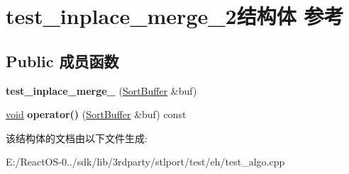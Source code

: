 \hypertarget{structtest__inplace__merge__2}{}\section{test\+\_\+inplace\+\_\+merge\+\_\+2结构体 参考}
\label{structtest__inplace__merge__2}
\subsection*{Public 成员函数}
\begin{DoxyCompactItemize}
\item 
\mbox{\label{structtest__inplace__merge__2_a089b4073af88bdbc1c2d04809718d3d3}} 
{\bfseries test\+\_\+inplace\+\_\+merge\+\_} (\hyperlink{struct_sort_buffer}{Sort\+Buffer} \&buf)
\item 
\mbox{\label{structtest__inplace__merge__2_a9efc5ef3b1419e7d503ba6daa676da8d}} 
\hyperlink{interfacevoid}{void} {\bfseries operator()} (\hyperlink{struct_sort_buffer}{Sort\+Buffer} \&buf) const
\end{DoxyCompactItemize}


该结构体的文档由以下文件生成\+:\begin{DoxyCompactItemize}
\item 
E\+:/\+React\+O\+S-\/0../sdk/lib/3rdparty/stlport/test/eh/test\+\_\+algo.\+cpp\end{DoxyCompactItemize}
